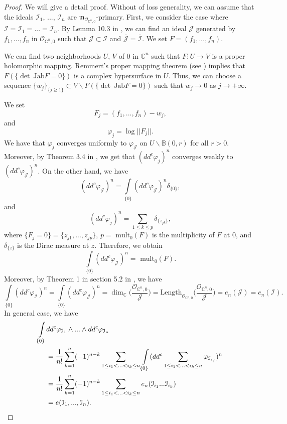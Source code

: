 \documentclass[a4paper,oneside,reqno,11pt]{article}
\begin{document}
\begin{proof} We will give a detail proof. Without of loss generality, we can assume that the ideals $\mathcal I_1$, ..., $\mathcal I_n$ are $\mathfrak{m}_{ \mathcal O_{ \mathbb C^n, 0} }$-primary. First, we consider the case where $\mathcal I = \mathcal I_1 = ... = \mathcal I_n$. By Lemma 10.3 in \cite{De12} , we can find an ideal $\mathcal J$ generated by $f_1,...,f_n$ in $\mathcal O_{ \mathbb C^n, 0}$ such that $\mathcal J\subset\mathcal I$ and $\bar { \mathcal J } = \bar { \mathcal I }$. We set $F = (f_1,...,f_n)$. 
	
We can find two neighborhoods $U$, $V$ of $0$ in $\mathbb C^n$ such that $F:U\to V$ is a proper holomorphic mapping. Remmert's proper mapping theorem (see \cite{BN90}) implies that $F( \{ \det\ \text{Jab} F = 0 \} )$ is a complex hypersurface in $U$. Thus, we can choose a sequence $\{w_j\}_{ \{ j\geq 1 \} }\subset V\backslash F( \{ \det\ \text{Jab} F = 0 \} )$ such that $w_j\to 0$ as $j\to +\infty$. 

We set
$$F_j = (f_1,...,f_n) - w_j,$$
and
$$\varphi_j = \log || F_j ||.$$
We have that $\varphi_j$ converges uniformly to $\varphi_{ \mathcal J }$ on $U\backslash \mathbb B (0,r)$ for all $r >0$. Moreover, by Theorem 3.4 in \cite{Hi08} , we get that $(dd^c \varphi_j)^n$ converges weakly to $( dd^c \varphi_{ \mathcal J } )^n$. On the other hand, we have
$$( dd^c \varphi_{ \mathcal J } )^n = \int\limits_{ \{ 0 \} } ( dd^c \varphi_{ \mathcal J } )^n \delta_{ \{ 0 \} },$$
and
$$(dd^c \varphi_j)^n = \sum\limits_{ 1\leq k\leq p } \delta_{ \{ z_{jk} \} },$$
where $\{ F_j = 0 \} = \{ z_{j1}, ..., z_{jp} \}$, $p=\text { mult}_0 ( F )$ is the multiplicity of $F$ at $0$, and $\delta_{ \{ z \} }$ is the Dirac measure at $z$. Therefore, we obtain
$$\int\limits_{ \{ 0\} } ( dd^c \varphi_{\mathcal J } )^n = \text { mult}_0 ( F ).$$
Moreover, by Theorem 1 in section 5.2 in \cite{AGV85}, we have
$$\int\limits_{ \{ 0\} } ( dd^c \varphi_{\mathcal I } )^n = \int\limits_{ \{ 0\} } ( dd^c \varphi_{\mathcal J } )^n = \dim_{ \mathbb C } \big(\frac { \mathcal O_{ \mathbb C^n, 0} } { \mathcal J } \big)
 = \text{Length}_{ \mathcal O_{ \mathbb C^n, 0} } \big( \frac { \mathcal O_{ \mathbb C^n, 0} } { \mathcal J } \big) = e_n (\mathcal J) = e_n (\mathcal I).$$
In general case, we have
$$\aligned
\int\limits_{ \{ 0\} }& dd^c \varphi_{\mathcal I_1}\wedge ... \wedge dd^c \varphi_{\mathcal I_n}\\
&=\frac { 1 } { n! } \sum\limits_{ k = 1 }^{ n } (-1)^{ n -k }\sum\limits_{ 1 \leq i_1 < ... < i_k\leq n } \int\limits_{ \{ 0\} } ( dd^c \sum\limits_{ 1 \leq i_1 < ... < i_k\leq n } \varphi_{ \mathcal I_{i_j} } )^n\\
&=\frac { 1 } { n! } \sum\limits_{ k = 1 }^{ n } (-1)^{ n -k }\sum\limits_{ 1 \leq i_1 < ... < i_k\leq n } e_n ( \mathcal I_{ i_1 } ...\mathcal I_{ i_k } )\\
&= e (\mathcal I_1, ..., \mathcal I_n).
\endaligned$$
\end{proof}
\end{document}
